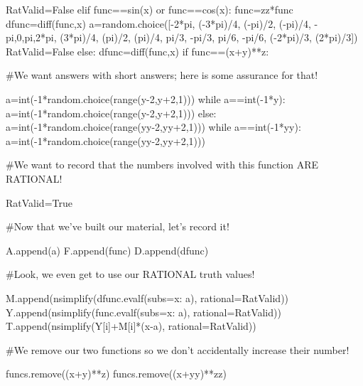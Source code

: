 \documentclass[ebook,12pt,oneside,openany]{memoir} %
\begin{document}
\begin{sympycode}
		RatValid=False
	elif func==sin(x) or func==cos(x):
		func=zz*func
		dfunc=diff(func,x)
		a=random.choice([-2*pi, (-3*pi)/4, (-pi)/2, (-pi)/4, -pi,0,pi,2*pi, (3*pi)/4, (pi)/2, (pi)/4, pi/3, -pi/3, pi/6, -pi/6, (-2*pi)/3, (2*pi)/3])
		RatValid=False
	else:
		dfunc=diff(func,x)
		if func==(x+y)**z:


#We want answers with short answers; here is some assurance for that!

			a=int(-1*random.choice(range(y-2,y+2,1)))
			while a==int(-1*y):
				a=int(-1*random.choice(range(y-2,y+2,1)))
		else:
			a=int(-1*random.choice(range(yy-2,yy+2,1)))
			while a==int(-1*yy):
				a=int(-1*random.choice(range(yy-2,yy+2,1)))


#We want to record that the numbers involved with this function ARE RATIONAL!

		RatValid=True


#Now that we've built our material, let's record it!

	A.append(a)
	F.append(func)
	D.append(dfunc)


#Look, we even get to use our RATIONAL truth values!

	M.append(nsimplify(dfunc.evalf(subs={x: a}), rational=RatValid))
	Y.append(nsimplify(func.evalf(subs={x: a}), rational=RatValid))
	T.append(nsimplify(Y[i]+M[i]*(x-a), rational=RatValid))


#We remove our two functions so we don't accidentally increase their number!

	funcs.remove((x+y)**z)
	funcs.remove((x+yy)**zz)

\end{sympycode}



\end{document}
